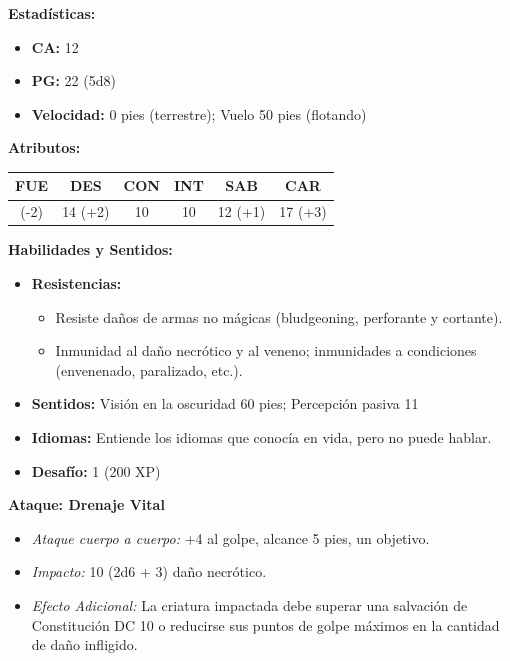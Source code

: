 \documentclass[
  twocolumn]{article}
\providecommand{\tightlist}{%
  \setlength{\itemsep}{0pt}\setlength{\parskip}{0pt}}
\begin{document}
\textbf{Estadísticas:}

\begin{itemize}
\tightlist
\item
  \textbf{CA:} 12
\item
  \textbf{PG:} 22 (5d8)
\item
  \textbf{Velocidad:} 0 pies (terrestre); Vuelo 50 pies (flotando)
\end{itemize}

\textbf{Atributos:}

\begin{longtable}[]{@{}cccccc@{}}
\toprule\noalign{}
FUE & DES & CON & INT & SAB & CAR \\
\midrule\noalign{}
\endhead
\bottomrule\noalign{}
\endlastfoot
6 (-2) & 14 (+2) & 10 & 10 & 12 (+1) & 17 (+3) \\
\end{longtable}

\textbf{Habilidades y Sentidos:}

\begin{itemize}
\tightlist
\item
  \textbf{Resistencias:}

  \begin{itemize}
  \tightlist
  \item
    Resiste daños de armas no mágicas (bludgeoning, perforante y
    cortante).
  \item
    Inmunidad al daño necrótico y al veneno; inmunidades a condiciones
    (envenenado, paralizado, etc.).
  \end{itemize}
\item
  \textbf{Sentidos:} Visión en la oscuridad 60 pies; Percepción pasiva
  11
\item
  \textbf{Idiomas:} Entiende los idiomas que conocía en vida, pero no
  puede hablar.
\item
  \textbf{Desafío:} 1 (200 XP)
\end{itemize}

\textbf{Ataque: Drenaje Vital}

\begin{itemize}
\tightlist
\item
  \emph{Ataque cuerpo a cuerpo:} +4 al golpe, alcance 5 pies, un
  objetivo.
\item
  \emph{Impacto:} 10 (2d6 + 3) daño necrótico.
\item
  \emph{Efecto Adicional:} La criatura impactada debe superar una
  salvación de Constitución DC 10 o reducirse sus puntos de golpe
  máximos en la cantidad de daño infligido.
\end{itemize}
\end{document}
